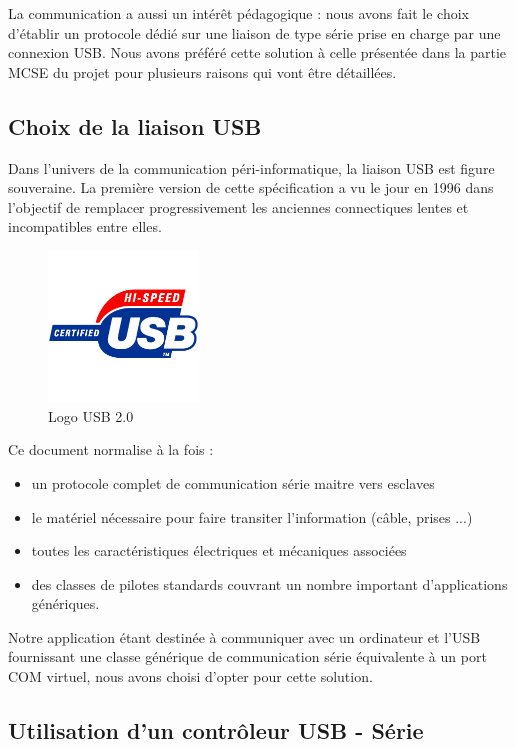 \documentclass[11pt, french]{article} %
\begin{document}
La communication a aussi un intérêt pédagogique : nous avons fait le choix d'établir un protocole dédié sur une liaison de type série prise en charge par une connexion USB. Nous avons préféré cette solution à celle présentée dans la partie MCSE du projet pour plusieurs raisons qui vont être détaillées.

\subsection{Choix de la liaison USB}
	
Dans l'univers de la communication péri-informatique, la liaison USB est figure souveraine. La première version de cette spécification a vu le jour en 1996 dans l'objectif de remplacer progressivement les anciennes connectiques lentes et incompatibles entre elles.

\begin{figure}
	\includegraphics[width = 4cm]{SolutionNumerique/usb-logo.jpg}
	\caption{Logo USB 2.0}
\end{figure}

\medskip
Ce document normalise à la fois : 
\medskip
\begin{itemize}
	\item un protocole complet de communication série maitre vers esclaves
	\item le matériel nécessaire pour faire transiter l'information (câble, prises ...)
	\item toutes les caractéristiques électriques et mécaniques associées
	\item des classes de pilotes standards couvrant un nombre important d'applications génériques.
\end{itemize}

\medskip
Notre application étant destinée à communiquer avec un ordinateur et l'USB fournissant une classe générique de communication série équivalente à un port COM virtuel, nous avons choisi d'opter pour cette solution.

\subsection{Utilisation d'un contrôleur USB - Série}
\end{document}
